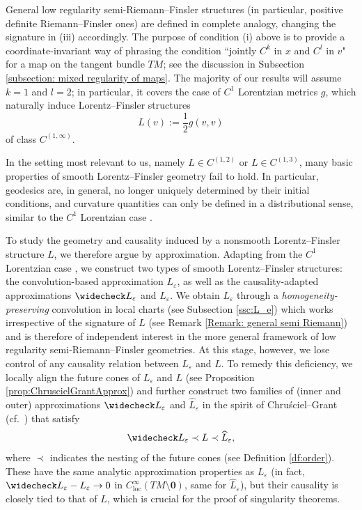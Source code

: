 \documentclass[a4paper,11pt]{article}
\numberwithin{equation}{section}
\theoremstyle{definition}
\theoremstyle{plain}
\newcommand{\eps}{\varepsilon}
\begin{document}
General low regularity semi-Riemann--Finsler structures (in particular, positive definite Riemann--Finsler ones) are defined in complete analogy, changing the signature in (iii) accordingly. 
The purpose of condition (i) above is to provide a coordinate-invariant way of phrasing the condition ``jointly $C^k$ in $x$ and $C^l$ in $v$" for a map on the tangent bundle $TM$; see the discussion in Subsection \ref{subsection: mixed regularity of maps}. 
The majority of our results will assume $k = 1$ and $l = 2$; in particular, it covers the case of $C^1$ Lorentzian metrics $g$, which naturally induce Lorentz--Finsler structures
\begin{equation*}
    L(v):=\frac{1}{2} g(v,v)
\end{equation*}
of class $C^{(1,\infty)}$.

In the setting most relevant to us, namely $L \in C^{(1,2)}$ or $L \in C^{(1,3)}$, many basic properties of smooth Lorentz--Finsler geometry fail to hold.
In particular, geodesics are, in general, no longer uniquely determined by their initial conditions, and curvature quantities can only be defined in a distributional sense, similar to the $C^1$ Lorentzian case \cite{Graf-SingularityC1, KOSS, SchinnerlSteinbauer, quintetnonsmooth}.

To study the geometry and causality induced by a nonsmooth Lorentz--Finsler structure $L$, we therefore argue by approximation. 
Adapting from the $C^1$ Lorentzian case \cite{Graf-SingularityC1, KOSS}, we construct two types of smooth Lorentz--Finsler structures: the convolution-based approximation $L_\varepsilon$, as well as the causality-adapted approximations $\widecheck L_\varepsilon$ and $\widehat L_\varepsilon$.
We obtain $L_\varepsilon$ through a \emph{homogeneity-preserving} convolution in local charts (see Subsection \ref{ssc:L_e}) which works irrespective of the signature of $L$ (see Remark \ref{Remark: general semi Riemann}) and is therefore of independent interest in the more general framework of low regularity semi-Riemann--Finsler geometries.
At this stage, however, we lose control of any causality relation between $L_\eps$ and $L$.
To remedy this deficiency, we locally align the future cones of $L_\varepsilon$ and $L$ (see Proposition \ref{prop:ChruscielGrantApprox}) and further construct two families of (inner and outer) approximations $\widecheck L_\eps$ and $\widehat L_\eps$ in the spirit of Chru\'sciel--Grant (cf.\ \cite{ChruscielGrant}) that satisfy 
\[
\widecheck L_\varepsilon \prec L \prec \widehat L_\varepsilon,
\]
where $\prec$ indicates the nesting of the future cones (see Definition \ref{df:order}).
These have the same analytic approximation properties as $L_\varepsilon$ (in fact, $\widecheck L_\varepsilon - L_\varepsilon \to 0$ in $C^\infty_{\mathrm{loc}}(TM \setminus \mathbf{0})$, same for $\widehat L_\varepsilon$), but their causality is closely tied to that of $L$, which is crucial for the proof of singularity theorems.
\end{document}
